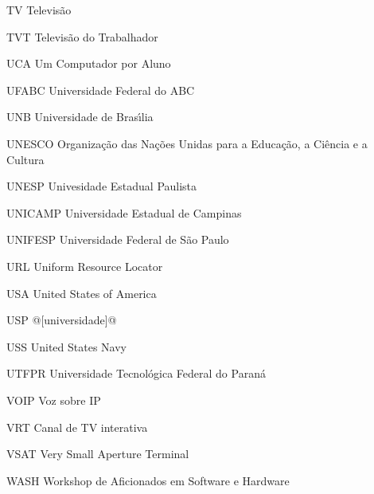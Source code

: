 \begin{siglas}
\item[TV] Televis\~ao
\item[TVT] Televis\~ao do Trabalhador
\item[UCA] Um Computador por Aluno
\item[UFABC] Universidade Federal do ABC 
\item[UNB] Universidade de Bras\'{\i}lia
\item[UNESCO] Organiza\c{c}\~ao das Na\c{c}\~oes Unidas para a Educa\c{c}\~ao, a Ci\^encia e a Cultura  
\item[UNESP] Univesidade Estadual Paulista
\item[UNICAMP] Universidade Estadual de Campinas
\item[UNIFESP] Universidade Federal de S\~ao Paulo
\item[URL] Uniform Resource Locator
\item[USA] United States of America
\item[USP] @[universidade]@
\item[USS] United States Navy
\item[UTFPR] Universidade Tecnol\'ogica Federal do Paran\'a
\item[VOIP] Voz sobre IP
\item[VRT] Canal de TV interativa
\item[VSAT] Very Small Aperture Terminal
\item[WASH] Workshop de Aficionados em Software e Hardware

\end{siglas}
